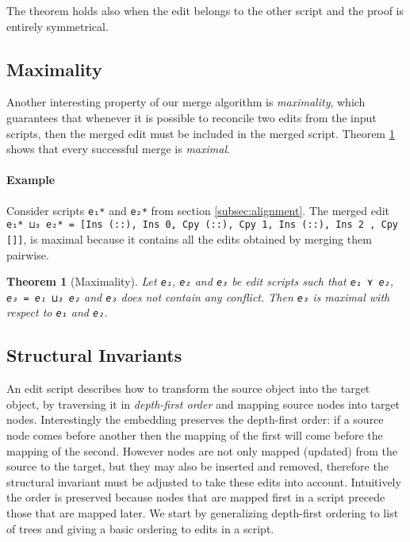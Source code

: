 \documentclass{sigplanconf}
\theoremstyle{plain}
\newtheorem{thm}{Theorem}
\begin{document}
    The theorem holds also when the edit belongs to the other script and
    the proof is entirely symmetrical.
   		
    \subsection{Maximality}
    Another interesting property of our merge algorithm is
    \emph{maximality}, which guarantees that whenever it is possible
    to reconcile two edits from the input scripts, then the merged
    edit must be included in the merged script.
    Theorem \ref{thm:max} shows that every successful merge is
    \emph{maximal}.

    \paragraph{Example} 
    Consider scripts \texttt{e₁*} and \texttt{e₂*} from section
    \ref{subsec:alignment}.
    The merged edit \texttt{e₁* ⊔₃ e₂* = [Ins (::), Ins 0, Cpy (::),
      Cpy 1, Ins (::), Ins 2 , Cpy []]}, is maximal because it
    contains all the edits obtained by merging them pairwise.
    \begin{thm}[Maximality]
      \label{thm:max}
      Let \texttt{e₁}, \texttt{e₂} and \texttt{e₃} be edit scripts
      such that \texttt{e₁ ⋎ e₂}, \texttt{e₃ = e₁ ⊔₃ e₂} and
      \texttt{e₃} does not contain any conflict. Then \texttt{e₃} is
      maximal with respect to \texttt{e₁} and \texttt{e₂}.
    \end{thm}

    \subsection{Structural  Invariants}
    
    An edit script describes how to transform the source object into
    the target object, by traversing it in \emph{depth-first order}
    and mapping source nodes into target nodes.
    Interestingly the embedding preserves the depth-first order: if a
    source node comes before another then the mapping of the first
    will come before the mapping of the second.    
    However nodes are not only mapped (updated) from the source to the
    target, but they may also be inserted and removed, therefore the
    structural invariant must be adjusted to take these edits into
    account.
    Intuitively the order is preserved because nodes that 
    are mapped first in a script precede those that are mapped later.
    We start by generalizing depth-first ordering to list of trees and
    giving a basic ordering to edits in a script.
    
\end{document}
